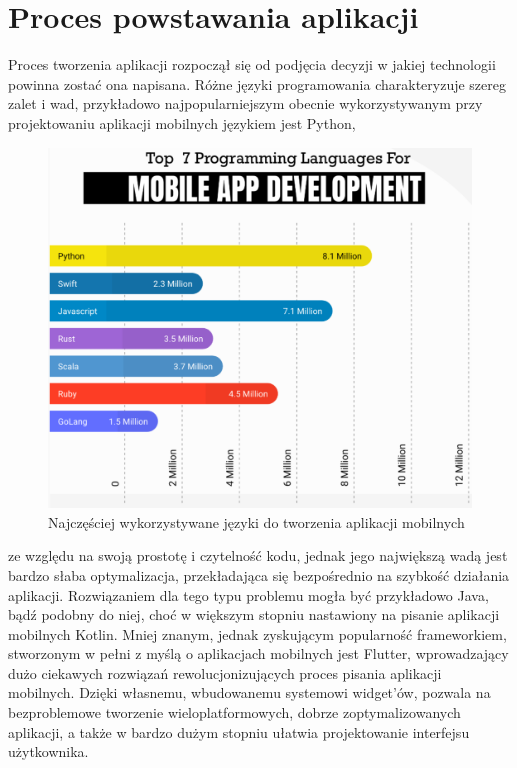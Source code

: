 \documentclass[12pt, a4paper]{article}
\begin{document}
\begin{sloppypar}
\section{Proces powstawania aplikacji}
{
  Proces tworzenia aplikacji rozpoczął się od podjęcia decyzji w jakiej technologii powinna
  zostać ona napisana. Różne języki programowania charakteryzuje szereg zalet i wad, przykładowo
  najpopularniejszym obecnie wykorzystywanym przy projektowaniu aplikacji mobilnych
  językiem jest Python,
  \begin{figure}[H]
    \centering
    \includegraphics[width=.9\textwidth]{top-lang-info.PNG}
    \caption{Najczęściej wykorzystywane języki do tworzenia aplikacji mobilnych}
    \label{fig:lang}
  \end{figure} 
  ze względu na swoją prostotę i czytelność kodu, jednak jego największą wadą jest bardzo
  słaba optymalizacja, przekładająca się bezpośrednio na szybkość działania aplikacji.
  Rozwiązaniem dla tego typu problemu mogła być przykładowo Java, bądź podobny do niej,
  choć w większym stopniu nastawiony na pisanie aplikacji mobilnych Kotlin. Mniej znanym,
  jednak zyskującym popularność frameworkiem, stworzonym w pełni z myślą o aplikacjach mobilnych
  jest Flutter, wprowadzający dużo ciekawych rozwiązań rewolucjonizujących proces pisania
  aplikacji mobilnych. Dzięki własnemu, wbudowanemu systemowi widget'ów, pozwala na
  bezproblemowe tworzenie wieloplatformowych, dobrze zoptymalizowanych aplikacji, a także
  w bardzo dużym stopniu ułatwia projektowanie interfejsu użytkownika.

}
\end{sloppypar}
\end{document}
